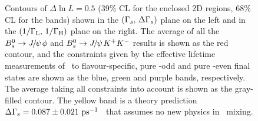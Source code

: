 \begin{figure}
\begin{center}
\caption{Contours of $\Delta \ln L = 0.5$ (39\% CL for the enclosed 2D regions, 68\% CL for the bands)
shown in the $(\Gamma_{s},\,\Delta\Gamma_{s})$ plane on the left
and in the $(1/\Gamma_{\rm L},\,1/\Gamma_{\rm H})$ plane on the right. 
The average of all the $B^0_s \to {J\mskip -3mu/\mskip -2mu\psi\mskip 2mu}\phi$ and $B^0_s\to {J\mskip -3mu/\mskip -2mu\psi\mskip 2mu} K^+K^-$ 
results is shown as the red contour,
and the constraints given by the effective lifetime measurements of
\Bs\ to flavour-specific, pure \CP-odd and pure \CP-even final states
are shown as the blue, green and purple bands, 
respectively. The average taking all constraints into account is shown as the gray-filled contour.
The yellow band is a theory prediction
$\Delta\Gamma_{s} = 0.087 \pm 0.021~\hbox{ps}^{-1}$~\cite{Lenz:2011ti,*Lenz:2006hd}
that assumes no new physics in \Bs\ mixing.}
\end{center}
\end{figure}

